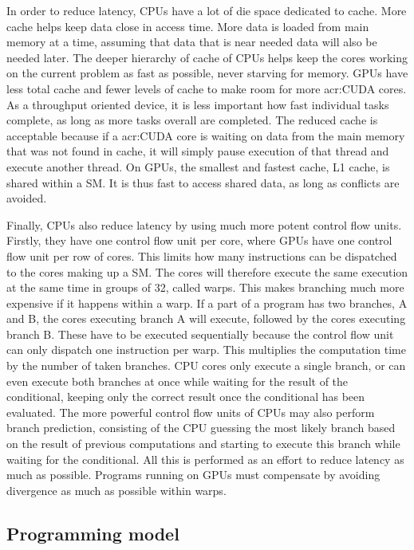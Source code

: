 In order to reduce latency, CPUs have a lot of die space dedicated to cache. More cache helps keep
data close in access time. More data is loaded from main memory at a time, assuming that data that
is near needed data will also be needed later. The deeper hierarchy of cache of CPUs helps keep the
cores working on the current problem as fast as possible, never starving for memory. GPUs have less
total cache and fewer levels of cache to make room for more \acrshort{acr:CUDA} cores. As a
throughput oriented device, it is less important how fast individual tasks complete, as long as more
tasks overall are completed. The reduced cache is acceptable because if a \acrshort{acr:CUDA} core
is waiting on data from the main memory that was not found in cache, it will simply pause execution
of that thread and execute another thread. On GPUs, the smallest and fastest cache, L1 cache, is
shared within a SM. It is thus fast to access shared data, as long as conflicts are avoided.

Finally, CPUs also reduce latency by using much more potent control flow units. Firstly, they have
one control flow unit per core, where GPUs have one control flow unit per row of cores. This limits
how many instructions can be dispatched to the cores making up a SM. The cores will therefore
execute the same execution at the same time in groups of 32, called warps. This makes branching much
more expensive if it happens within a warp. If a part of a program has two branches, A and B, the
cores executing branch A will execute, followed by the cores executing branch B. These have to be
executed sequentially because the control flow unit can only dispatch one instruction per warp. This
multiplies the computation time by the number of taken branches. CPU cores only execute a single
branch, or can even execute both branches at once while waiting for the result of the conditional,
keeping only the correct result once the conditional has been evaluated. The more powerful control
flow units of CPUs may also perform branch prediction, consisting of the CPU guessing the most
likely branch based on the result of previous computations and starting to execute this branch while
waiting for the conditional. All this is performed as an effort to reduce latency as much as
possible. Programs running on GPUs must compensate by avoiding divergence as much as possible within
warps.

\subsection{Programming model} \label{subsection:graphics_processing_units:architecture:programming_model}

